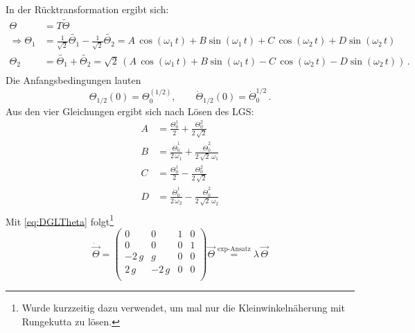 In der Rücktransformation ergibt sich:
\begin{equation*}
	\begin{split}
		\Theta &= T \tilde{\Theta} \\
		\Rightarrow \Theta_1 &= \frac{1}{\sqrt{2}} \tilde{\Theta_1} - \frac{1}{\sqrt{2}} \tilde{\Theta_2} = A\,\cos(\omega_1\,t)+B\sin(\omega_1\,t)+C\,\cos(\omega_2\,t)+D\sin(\omega_2\,t) \\
		\Theta_2 &= \tilde{\Theta_1} + \tilde{\Theta_2} = \sqrt{2}\,\left(A\,\cos(\omega_1\,t)+B\sin(\omega_1\,t)-C\,\cos(\omega_2\,t)-D\sin(\omega_2\,t)\right)\,.\\
	\end{split}
\end{equation*}
Die Anfangsbedingungen lauten
\begin{equation*}
	\Theta_{1/2}(0) = \Theta_0^{(1/2)}, \qquad \dot{\Theta}_{1/2}(0) = \dot{\Theta}^{1/2}_0 \,.
\end{equation*}
Aus den vier Gleichungen ergibt sich nach Lösen des LGS:
\begin{equation*}
	\begin{split}
		A &= \frac{\Theta_0^1}{2} + \frac{\Theta_0^2}{2\,\sqrt{2}} \\
		B &= \frac{\dot{\Theta}_0^1}{2\,\omega_1} + \frac{\dot{\Theta}_0^2}{2\,\sqrt{2}\,\omega_1} \\
		C &= \frac{\Theta_0^1}{2} - \frac{\Theta_0^2}{2\,\sqrt{2}} \\
		D &= \frac{\dot{\Theta}_0^1}{2\,\omega_2} - \frac{\dot{\Theta}_0^2}{2\,\sqrt{2}\,\omega_2} \\
	\end{split}
\end{equation*}
Mit \ref{eq:DGLTheta} folgt\footnote{Wurde kurzzeitig dazu verwendet, um mal nur die
Kleinwinkelnäherung mit Rungekutta zu lösen.}
\begin{equation*}
	\dot{\vec{\Theta}} = 
	\begin{pmatrix}
		0 & 0 & 1 & 0 \\
		0 & 0 & 0 & 1 \\
		-2\,g & g & 0 & 0 \\
		2\,g & -2\,g & 0 & 0 \\
	\end{pmatrix}
	\vec{\Theta} \stackrel{\text{exp-Ansatz}}{=} \lambda\, \vec{\Theta}
\end{equation*} 

